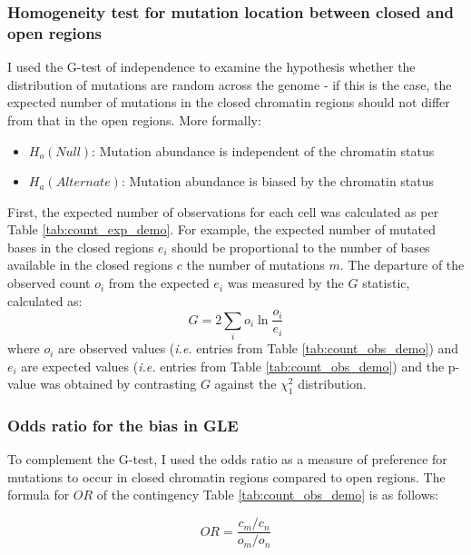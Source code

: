 

\subsubsection{Homogeneity test for mutation location between closed and open regions}
I used the G-test of independence \citep{McDonald2014GtestStatistics} to examine the hypothesis whether the distribution of mutations are random across the genome - if this is the case, the expected number of mutations in the closed chromatin regions should not differ from that in the open regions. More formally:

\begin{itemize}
    \item $H_o (Null)$: Mutation abundance is independent of the chromatin status
    \item $H_a (Alternate)$: Mutation abundance is biased by the chromatin status
\end{itemize}

First, the expected number of observations for each cell was calculated as per Table \ref{tab:count_exp_demo}. For example, the expected number of mutated bases in the closed regions $e_i$ should be proportional to the number of bases available in the closed regions $c$ the number of mutations $m$. The departure of the observed count $o_i$ from the expected $e_i$ was measured by the $G$ statistic, calculated as:
\begin{equation}
    G = 2 \underset{i}{\sum} o_{i} \ln \frac{o_{i}}{e_{i}}
    \label{eq:g}
\end{equation}
where $o_{i}$ are observed values (\textit{i.e.} entries from Table \ref{tab:count_obs_demo}) and $e_{i}$ are expected values (\textit{i.e.} entries from Table \ref{tab:count_obs_demo}) and the p-value was obtained by contrasting $G$ against the $\chi^2_1$ distribution.



\subsubsection{Odds ratio for the bias in GLE}
To complement the G-test, I used the odds ratio \citep[$OR$;][]{Hoppe2017OddsRatios} as a measure of preference for mutations to occur in closed chromatin regions compared to open regions. The formula for $OR$ of the contingency Table \ref{tab:count_obs_demo} is as follows:

\begin{equation}
    OR = \frac{c_m/c_n}{o_m/o_n}
    \label{eq:or}
\end{equation}

